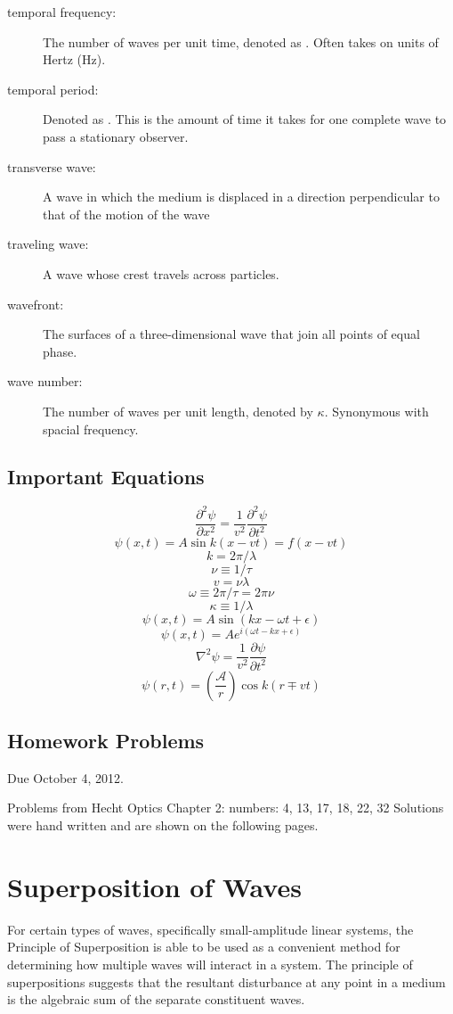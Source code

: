 \documentclass[12pt]{report}
\begin{document}
\begin{description}
\item[temporal frequency:] The number of waves per unit time, denoted as \textnu. Often takes on units of Hertz (Hz). 
\item[temporal period:] Denoted as \texttau. This is the amount of time it takes for one complete wave to pass a stationary observer.
\item[transverse wave:] A wave in which the medium is displaced in a direction perpendicular to that of the motion of the wave
\item[traveling wave:] A wave whose crest travels across particles.
\item[wavefront:] The surfaces of a three-dimensional wave that join all points of equal phase. 
\item[wave number:] The number of waves per unit length, denoted by $\kappa$. Synonymous with spacial frequency. 
\end{description}
\section{Important Equations}
\[\frac{\partial ^2\psi}{\partial x^2} = \frac{1}{v^2}\frac{\partial ^2\psi}{\partial t^2}\]
\[\psi(x,t) = A\sin k(x-vt) = f(x-vt)\]
\[k = 2\pi /\lambda\]
\[\nu \equiv 1/\tau\]
\[v = \nu\lambda\]
\[\omega \equiv 2\pi/\tau = 2\pi\nu\]
\[\kappa \equiv 1/\lambda\]
\[\psi(x,t) = A \sin (kx-\omega t +\epsilon)\]
\[\psi(x,t) = Ae^{i(\omega t -kx+\epsilon)}\]
\[\nabla^2 \psi = \frac{1}{v^2}\frac{\partial\psi}{\partial t^2}\]
\[\psi (r,t) = \left( \frac{\mathcal{A}}{r} \right)\cos k(r \mp vt )\]

\section{Homework Problems}

Due October 4, 2012.

Problems from Hecht Optics Chapter 2: numbers: 4, 13, 17, 18, 22, 32
Solutions were hand written and are shown on the following pages. 



\chapter{Superposition of Waves}
For certain types of waves, specifically small-amplitude linear systems, the Principle of Superposition is able to be used as a convenient method for determining how multiple waves will interact in a system. The  principle of superpositions suggests that the resultant disturbance at any point in a medium is the algebraic sum of the separate constituent waves. 
\end{document}
